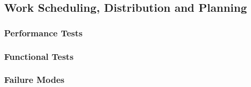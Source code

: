 
\subsection{Work Scheduling, Distribution and Planning}
\label{sec:verification_sdp}


\subsubsection{Performance Tests}
\label{sec:sdp_pt}

\subsubsection{Functional Tests}
\label{sec:sdp_ft}

\subsubsection{Failure Modes}
\label{sec:sdp_fm}
